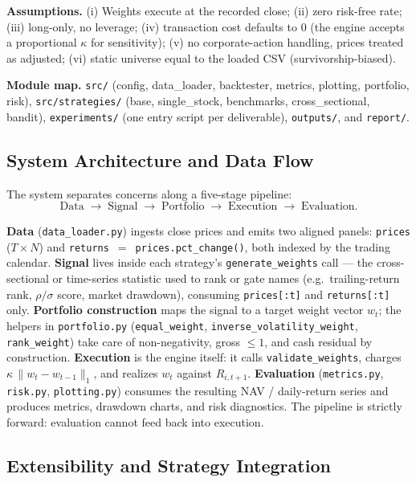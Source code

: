 \documentclass[11pt]{article}
\begin{document}
\textbf{Assumptions.} (i) Weights execute at the recorded close;
(ii) zero risk-free rate; (iii) long-only, no leverage; (iv) transaction
cost defaults to 0 (the engine accepts a proportional $\kappa$ for
sensitivity); (v) no corporate-action handling, prices treated as
adjusted; (vi) static universe equal to the loaded CSV (survivorship-biased).

\textbf{Module map.} \texttt{src/} (config, data\_loader, backtester,
metrics, plotting, portfolio, risk), \texttt{src/strategies/} (base,
single\_stock, benchmarks, cross\_sectional, bandit),
\texttt{experiments/} (one entry script per deliverable),
\texttt{outputs/}, and \texttt{report/}.

\subsection*{System Architecture and Data Flow}

The system separates concerns along a five-stage pipeline:
\[
   \text{Data} \;\to\; \text{Signal} \;\to\; \text{Portfolio} \;\to\; \text{Execution} \;\to\; \text{Evaluation}.
\]

\textbf{Data} (\texttt{data\_loader.py}) ingests close prices and emits
two aligned panels: \texttt{prices} ($T \times N$) and
\texttt{returns}~$=$~\texttt{prices.pct\_change()}, both indexed by the
trading calendar. \textbf{Signal} lives inside each strategy's
\texttt{generate\_weights} call --- the cross-sectional or time-series
statistic used to rank or gate names (e.g.\ trailing-return rank,
$\rho/\sigma$ score, market drawdown), consuming \texttt{prices[:t]}
and \texttt{returns[:t]} only. \textbf{Portfolio construction} maps
the signal to a target weight vector $w_t$; the helpers in
\texttt{portfolio.py} (\texttt{equal\_weight},
\texttt{inverse\_volatility\_weight}, \texttt{rank\_weight}) take care
of non-negativity, gross $\le 1$, and cash residual by construction.
\textbf{Execution} is the engine itself: it calls
\texttt{validate\_weights}, charges
$\kappa\,\lVert w_t - w_{t-1}\rVert_1$, and realizes $w_t$ against
$R_{i,t+1}$. \textbf{Evaluation} (\texttt{metrics.py},
\texttt{risk.py}, \texttt{plotting.py}) consumes the resulting NAV /
daily-return series and produces metrics, drawdown charts, and risk
diagnostics. The pipeline is strictly forward: evaluation cannot feed
back into execution.

\subsection*{Extensibility and Strategy Integration}
\end{document}

